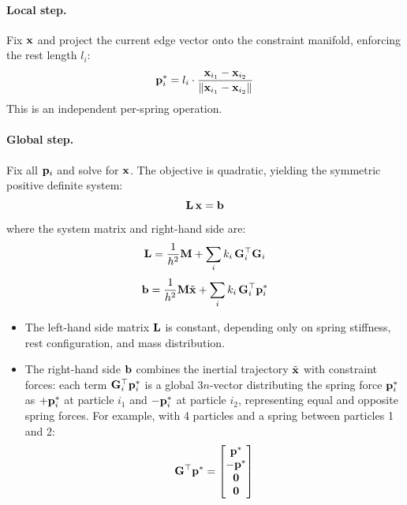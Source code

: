 \paragraph{Local step.}
Fix $\mathbf{x}$ and project the current edge vector onto the constraint manifold, enforcing the rest length $l_i$:
\begin{equation}
    \mathbf{p}_i^{*} = l_{i} \cdot \frac{\mathbf{x}_{i_1} - \mathbf{x}_{i_2}}{\| \mathbf{x}_{i_1} - \mathbf{x}_{i_2}\|}
\end{equation}
This is an independent per-spring operation.

\paragraph{Global step.}
Fix all $\mathbf{p}_i$ and solve for $\mathbf{x}$. The objective is quadratic, yielding the symmetric positive definite system:
\begin{equation}
    \mathbf{L}\,\mathbf{x} = \mathbf{b}
\end{equation}
where the system matrix and right-hand side are:
\begin{equation*}
    \mathbf{L} = \frac{1}{h^2}\mathbf{M} + \sum_i k_i\,\mathbf{G}_i^\top\mathbf{G}_i
\end{equation*} 
\begin{equation*}
    \mathbf{b} = \frac{1}{h^2}\mathbf{M}\tilde{\mathbf{x}} + \sum_i k_i\,\mathbf{G}_i^\top\mathbf{p}^*_i
\end{equation*} 
\begin{itemize}
    \item The left-hand side matrix $\mathbf{L}$ is constant, depending only on spring stiffness, rest configuration, and mass distribution.
    \item  The right-hand side $\mathbf{b}$ combines the inertial trajectory $\tilde{\mathbf{x}}$ with constraint forces: each term $\mathbf{G}_i^\top\mathbf{p}^*_i$ is a global $3n$-vector distributing the spring force $\mathbf{p}^*_i$ as $+\mathbf{p}^*_i$ at particle $i_1$ and $-\mathbf{p}^*_i$ at particle $i_2$, representing equal and opposite spring forces. For example, with 4 particles and a spring between particles 1 and 2:
    \begin{equation*}
        \mathbf{G}^\top\mathbf{p}^* = \begin{bmatrix} \mathbf{p}^* \\ -\mathbf{p}^* \\ \mathbf{0} \\ \mathbf{0} \end{bmatrix}
    \end{equation*}
\end{itemize}

